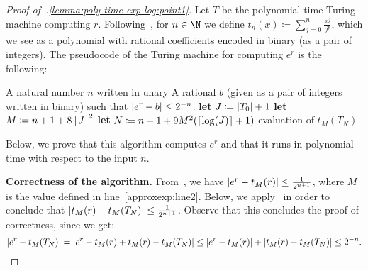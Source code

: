 \LemmaPolyTimeTMExpLog*

\begin{proof}[Proof of~.\ref{lemma:poly-time-exp-log:point1}]
  Let $T$ be the polynomial-time Turing machine computing $r$.
  Following~, for $n \in \N$ we define $t_n(x) \coloneqq
  \sum_{j=0}^{n} \frac{x^j}{j!}$, which we see as a polynomial with rational coefficients encoded in binary (as a pair of integers).
  The pseudocode of the Turing machine for computing $e^r$ is the following:
  \begin{algorithmic}[1]
    \Require \tab A natural number $n$ written in unary
    \Ensure \tab A rational $b$ (given as a pair of integers written in binary) such that $\left|e^r-b\right| \leq 2^{-n}$.%
    \State \textbf{let} $J \coloneqq \left|T_0\right|+1$ 
    \label{approxexp:line1}
    \State \textbf{let} $M \coloneqq n + 1 + 8\left\lceil J\right\rceil^2$
    \label{approxexp:line2}
    \State \textbf{let} $N \coloneqq n +1 + 9M^2 (\left\lceil\log(J)\right\rceil+1)$
    \label{approxexp:line3}
    \State \myreturn evaluation of $t_M(T_{N})$
    \label{approxexp:line4}
  \end{algorithmic}
  Below, we prove that this algorithm computes $e^r$ and that it runs in
  polynomial time with respect to the input $n$.

  \noindent
  \textbf{Correctness of the algorithm.}
  From~, we have $\left|e^r-t_M(r)\right| \leq \frac{1}{2^{n+1}}$, 
  where $M$ is the value defined in line~\ref{approxexp:line2}.
  Below, we apply~ in order to conclude that 
  $\left|t_M(r)-t_M(T_N)\right| \leq \frac{1}{2^{n+1}}$.
  Observe that this concludes the proof of correctness, since we get: 
  \[ 
    \abs{e^r-t_M(T_N)} = \abs{e^r-t_M(r)+t_M(r)-t_M(T_N)} 
    \leq \abs{e^r-t_M(r)}+ \abs{t_M(r)-t_M(T_N)} 
    \leq  2^{-n}.%
  \]


\end{proof}
